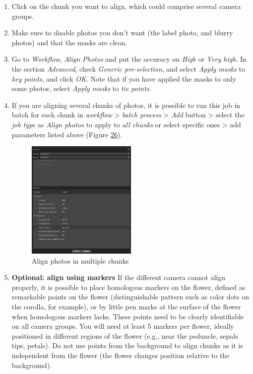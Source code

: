 \documentclass[
]{book}
\theoremstyle{definition}
\theoremstyle{definition}
\theoremstyle{definition}
\theoremstyle{definition}
\theoremstyle{remark}
\begin{document}
\begin{enumerate}
\def\labelenumi{\arabic{enumi}.}
\item
  Click on the chunk you want to align, which could comprise several
  camera groups.
\item
  Make sure to disable photos you don't want (the label photo, and
  blurry photos) and that the masks are clean.
\item
  Go to \emph{Workflow}, \emph{Align Photos} and put the accuracy on \emph{High} or
  \emph{Very high}. In the section \emph{Advanced}, check \emph{Generic
  pre-selection}, and select \emph{Apply masks} to \emph{key points}, and click
  \emph{OK}. Note that if you have applied the masks to only some photos,
  select \emph{Apply masks} to \emph{tie points}.
\item
  If you are aligning several chunks of photos, it is possible to run
  this job in batch for each chunk in \emph{workflow} \textgreater{} \emph{batch process} \textgreater{}
  \emph{Add} button \textgreater{} select the \emph{job type} as \emph{Align photos} to apply to
  \emph{all chunks} or select specific ones \textgreater{} add parameters listed above
  (Figure \protect\hyperlink{batch_alignment}{26}).

  \begin{figure}
  \hypertarget{batch_alignment}{%
  \centering
  \includegraphics[width=0.5\textwidth,height=\textheight]{Figures/metashape_batch_align.png}
  \caption{Align photos in multiple
  chunks}\label{batch_alignment}
  }
  \end{figure}
\item
  \textbf{Optional: align using markers} If the different camera cannot
  align properly, it is possible to place homologous markers on the
  flower, defined as remarkable points on the flower (distinguishable
  pattern such as color dots on the corolla, for example), or by
  little pen marks at the surface of the flower when homologous
  markers lacks. These points need to be clearly identifiable on all
  camera groups. You will need at least 5 markers per flower, ideally
  positioned in different regions of the flower (e.g., near the
  peduncle, sepals tips, petals). Do not use points from the
  background to align chunks as it is independent from the flower (the
  flower changes position relative to the background).


\end{enumerate}
\end{document}
